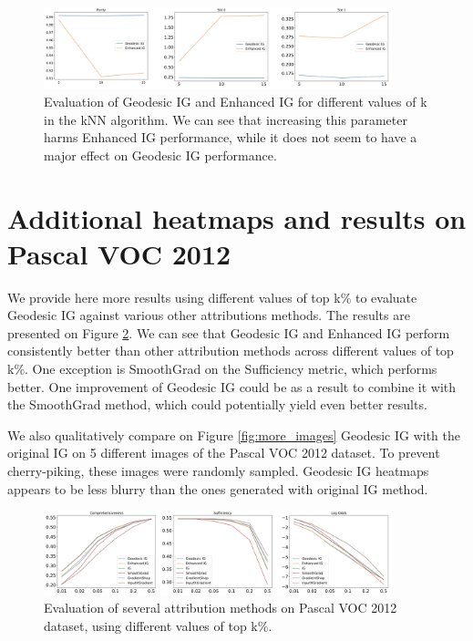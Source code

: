 \begin{figure}[ht]
\vskip 0.2in
\begin{center}
\centerline{\includegraphics[width=0.9\textwidth]{figures/knn.png}}
\caption{Evaluation of Geodesic IG and Enhanced IG for different values of k in the kNN algorithm. We can see that increasing this parameter harms Enhanced IG performance, while it does not seem to have a major effect on Geodesic IG performance.}
\label{fig:knn}
\end{center}
\vskip -0.2in
\end{figure}

\newpage

\section{Additional heatmaps and results on Pascal VOC 2012}
\label{app:voc}

We provide here more results using different values of top k\% to evaluate Geodesic IG against various other attributions methods. The results are presented on Figure \ref{fig:topk}. We can see that Geodesic IG and Enhanced IG perform consistently better than other attribution methods across different values of top k\%. One exception is SmoothGrad on the Sufficiency metric, which performs better. One improvement of Geodesic IG could be as a result to combine it with the SmoothGrad method, which could potentially yield even better results.

We also qualitatively compare on Figure \ref{fig:more_images} Geodesic IG with the original IG on 5 different images of the Pascal VOC 2012 dataset. To prevent cherry-piking, these images were randomly sampled. Geodesic IG heatmaps appears to be less blurry than the ones generated with original IG method.

\begin{figure}[ht]
\vskip 0.2in
\begin{center}
\centerline{\includegraphics[width=0.9\textwidth]{figures/topk.png}}
\caption{Evaluation of several attribution methods on Pascal VOC 2012 dataset, using different values of top k\%. }
\label{fig:topk}
\end{center}
\vskip -0.2in
\end{figure}

